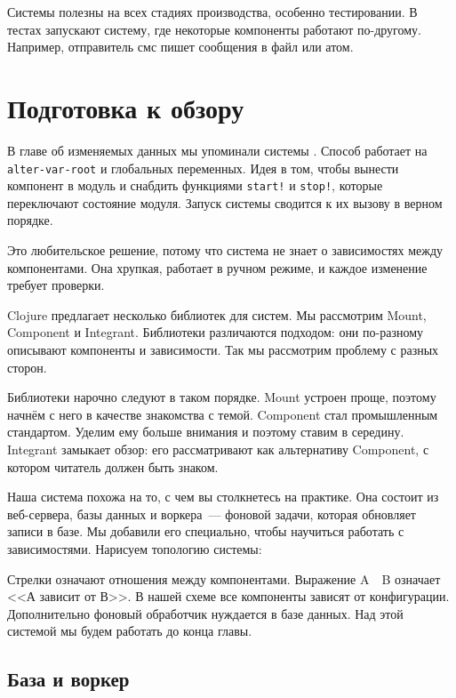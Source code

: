 Системы полезны на всех стадиях производства, особенно тестировании. В тестах
запускают систему, где некоторые компоненты работают по-другому. Например,
отправитель смс пишет сообщения в файл или атом.

\section{Подготовка к обзору}


В главе об изменяемых данных мы упоминали системы . Способ
работает на \verb|alter-var-root| и глобальных переменных. Идея в том, чтобы
вынести компонент в модуль и снабдить функциями \verb|start!| и
\verb|stop!|, которые переключают состояние модуля. Запуск системы сводится к
их вызову в верном порядке.

Это любительское решение, потому что система не знает о зависимостях между
компонентами. Она хрупкая, работает в ручном режиме, и каждое изменение требует
проверки.

Clojure предлагает несколько библиотек для систем. Мы рассмотрим Mount,
Component и Integrant. Библиотеки различаются подходом: они по-разному описывают
компоненты и зависимости. Так мы рассмотрим проблему с разных сторон.

Библиотеки нарочно следуют в таком порядке. Mount устроен проще, поэтому начнём
с него в качестве знакомства с темой. Component стал промышленным
стандартом. Уделим ему больше внимания и поэтому ставим в середину. Integrant
замыкает обзор: его рассматривают как альтернативу Component, с котором читатель
должен быть знаком.

Наша система похожа на то, с чем вы столкнетесь на практике. Она состоит из
веб-сервера, базы данных и воркера~--- фоновой задачи, которая обновляет записи
в базе. Мы добавили его специально, чтобы научиться работать с
зависимостями. Нарисуем топологию системы:


Стрелки означают отношения между компонентами. Выражение A~\arr~B означает
<<А зависит от В>>. В нашей схеме все компоненты зависят от конфигурации.
Дополнительно фоновый обработчик нуждается в базе данных. Над этой
системой мы будем работать до конца главы.

\subsection{База и воркер}

